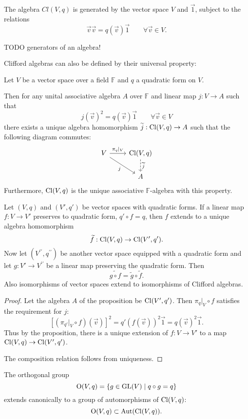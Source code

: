 \begin{lemma} \label{CliffordRelation}
The algebra $Cl(V,q)$ is generated by the vector space $V$ and $\vec{1}$, subject to the relations
\[ \vec{v}\vec{v} = q(\vec{v})\vec{1} \qquad \forall \vec{v}\in V. \]
\end{lemma}
TODO generators of an algebra!


Clifford algebras can also be defined by their universal property:
\begin{proposition} \label{CliffordUniversalProperty}
Let $V$ be a vector space over a field $\mathbb{F}$ and $q$ a quadratic form on $V$. 

Then for any unital associative algebra $A$ over $\mathbb{F}$ and linear map $j: V \to A$ such that
\[ j(\vec{v})^2 = q(\vec{v}) \vec{1} \qquad \forall \vec{v}\in V \]
there exists a unique algebra homomorphism $\widetilde{j}: \operatorname{Cl}(V,q)\to A$ such that the following diagram commutes:
\[ \begin{tikzcd}
V \rar{\pi_q|_V} \ar[dr, swap, "{j}"] & \Cl(V,q) \dar[dashed]{\widetilde{j}} \\
 & A
\end{tikzcd} \]
Furthermore, $\operatorname{Cl}(V,q)$ is the unique associative $\mathbb{F}$-algebra with this property.
\end{proposition}
\begin{corollary}
Let $(V,q)$ and $(V',q')$ be vector spaces with quadratic forms. If a linear map $f:V\to V'$ preserves to quadratic form, $q'\circ f = q$, then $f$ extends to a unique algebra homomorphism
\[ \widetilde{f}: \operatorname{Cl}(V,q) \to \operatorname{Cl}(V',q'). \]
Now let $(V^{\prime\prime},q^{\prime\prime})$ be another vector space equipped with a quadratic form and let $g: V'\to V^{\prime\prime}$ be a linear map preserving the quadratic form. Then
\[ \widetilde{g\circ f} = \widetilde{g}\circ\widetilde{f}. \]
Also isomorphisms of vector spaces extend to isomorphisms of Clifford algebras.
\end{corollary}
\begin{proof}
Let the algebra $A$ of the proposition be $\operatorname{Cl}(V',q')$. Then $\pi_q|_V\circ f$ satisfies the requirement for $j$:
\[ [(\pi_{q'}|_V\circ f)(\vec{v})]^2 = q'(f(\vec{v}))^2 \vec{1} = q(\vec{v})^2\vec{1}. \]
Thus by the proposition, there is a unique extension of $f:V\to V'$ to a map $\operatorname{Cl}(V,q) \to \operatorname{Cl}(V',q')$.

The composition relation follows from uniqueness.
\end{proof}
\begin{corollary} \label{qOrthogonalMaps}
The orthogonal group
\[ \operatorname{O}(V,q) = \left\{ g\in\operatorname{GL}(V) \;\middle|\; q\circ g = q \right\} \]
extends canonically to a group of automorphisms of $\operatorname{Cl}(V,q)$:
\[ \operatorname{O}(V,q) \subset \operatorname{Aut}(\operatorname{Cl}(V,q)). \]
\end{corollary}

